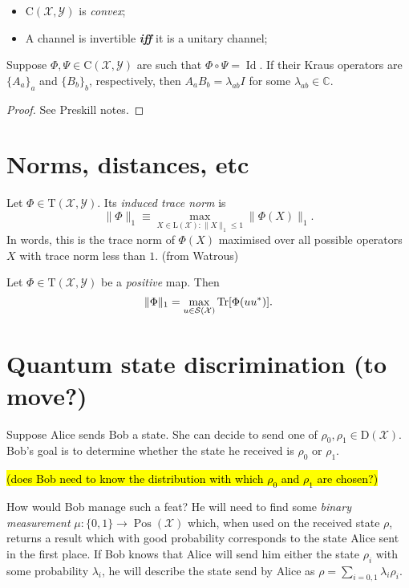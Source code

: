 \documentclass[12pt]{report}
\newcommand{\CC}{\mathbb{C}}
\newcommand{\calY}{{\mathcal{Y}}}
\newcommand{\calS}{{\mathcal{S}}}
\newcommand{\calX}{{\mathcal{X}}}
\newcommand{\rmC}{{\mathrm{C}}}
\newcommand{\rmD}{{\mathrm{D}}}
\newcommand{\rmL}{{\mathrm{L}}}
\newcommand{\rmT}{{\mathrm{T}}}
\DeclareMathOperator{\Pos}{Pos}
\DeclareMathOperator{\Id}{Id}
\begin{document}
\begin{itemize}
	\item $\rmC(\calX,\calY)$ is \emph{convex};
	\item A channel is invertible \emph{\textbf{iff}} it is a unitary channel;
\end{itemize}

\begin{thm}
	Suppose $\Phi,\Psi\in\rmC(\calX,\calY)$ are such that $\Phi\circ\Psi=\Id$. If their Kraus operators are $\{A_a\}_a$ and $\{B_b\}_b$, respectively, then $A_a B_b=\lambda_{ab} I$ for some $\lambda_{ab}\in\CC$.
\end{thm}
\begin{proof}
	See Preskill notes.
\end{proof}

\section{Norms, distances, etc}

\begin{defn}
	Let $\Phi\in\rmT(\calX,\calY)$. Its \emph{induced trace norm} is
	\begin{equation}
		\|\Phi\|_1 \equiv \max_{X\in\rmL(\calX): \|X\|_1\le 1}\|\Phi(X)\|_1.
	\end{equation}
	In words, this is the trace norm of $\Phi(X)$ maximised over all possible operators $X$ with trace norm less than $1$. (from Watrous)
\end{defn}

\begin{prop}
	Let $\Phi\in\rmT(\calX,\calY)$ be a \emph{positive} map. Then
	\begin{equation}
		\|\Phi\|_1 = \max_{u\in\calS(\calX)}\Tr[\Phi(uu^*)].
	\end{equation}
\end{prop}

\section{Quantum state discrimination (to move?)}

Suppose Alice sends Bob a state. She can decide to send one of $\rho_0,\rho_1\in\rmD(\calX)$. Bob's goal is to determine whether the state he received is $\rho_0$ or $\rho_1$.

\hl{(does Bob need to know the distribution with which $\rho_0$ and $\rho_1$ are chosen?)}

How would Bob manage such a feat? He will need to find some \emph{binary measurement} $\mu:\{0,1\}\to\Pos(\calX)$ which, when used on the received state $\rho$, returns a result which with good probability corresponds to the state Alice sent in the first place.
If Bob knows that Alice will send him either the state $\rho_i$ with some probability $\lambda_i$, he will describe the state send by Alice as
$\rho = \sum_{i=0,1} \lambda_i \rho_i$.
\end{document}
